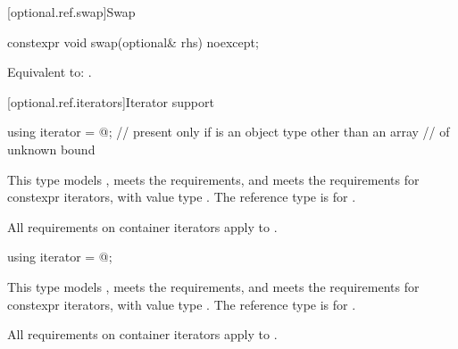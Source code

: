 [optional.ref.swap]{Swap}

%
\begin{itemdecl}
constexpr void swap(optional& rhs) noexcept;
\end{itemdecl}

\begin{itemdescr}
\pnum
\effects
Equivalent to: .
\end{itemdescr}

[optional.ref.iterators]{Iterator support}

\begin{removedblock}
\begin{itemdecl}
using iterator = @\impdefnc@;        // present only if  is an object type other than an array
// of unknown bound
\end{itemdecl}

\begin{itemdescr}
\pnum
This type models , meets the  requirements, and meets the requirements for constexpr iterators, with value type . The reference type is  for .

\pnum
All requirements on container iterators apply to .
\end{itemdescr}
\end{removedblock}

\begin{addedblock}
%
\begin{itemdecl}
using iterator = @\impdef@;
\end{itemdecl}

\begin{itemdescr}
\pnum
This type models , meets the  requirements, and meets the requirements for constexpr iterators, with value type . The reference type is  for .

\pnum
All requirements on container iterators apply to .
\end{itemdescr}
\end{addedblock}

